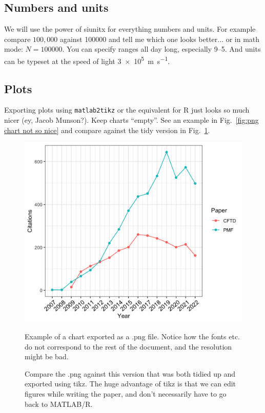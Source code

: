 \documentclass[11pt]{article}
\newcommand{\figref}[1]{Fig.~\ref{#1}}
\begin{document}
\subsection{Numbers and units}
We will use the power of siunitx for everything numbers and units. For example compare $100,000$ against \num{100000} and tell me which one looks better... or in math mode: $N = \num{100000}$. You can specify ranges all day long, especially \numrange{9}{5}. And units can be typeset at the speed of light \qty{3e5}{\meter\per\second}.

\subsection{Plots}
Exporting plots using \verb|matlab2tikz| or the equivalent for R just looks so much nicer (ey, Jacob Munson?). Keep charts ``empty''. See an example in \figref{fig:png chart not so nice} and compare against the tidy version in \figref{fig:tikz chart very nice}.

\begin{figure}
    \begin{minipage}[t]{.49\textwidth}    
    \centering
    \includegraphics[width=\textwidth]{figures/image.png}
        \caption{Example of a chart exported as a .png file. Notice how the fonts etc. do not correspond to the rest of the document, and the resolution might be bad.}
    \label{fig:png chart not so nice}
    \end{minipage}\hfill
    \begin{minipage}[t]{.49\textwidth}    
    \centering
    
    \caption{Compare the .png against this version that was both tidied up and exported using tikz. The huge advantage of tikz is that we can edit figures while writing the paper, and don't necessarily have to go back to MATLAB/R.}
    \label{fig:tikz chart very nice}
    \end{minipage}
\end{figure}
\end{document}
